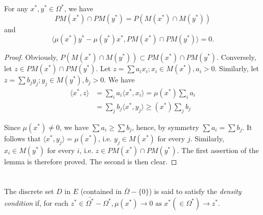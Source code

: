 \begin{lem}\label{chap6:lem4} %
  For any $x^* , y^* \in \Omega^* $, we have 
  $$
  PM(x^*)\cap PM (y^*) = P(M(x^*)\cap M (y^*)) 
  $$
  and 
  $$
  \langle \mu (x^*) y^* - \mu (y^*) x^*, PM (x^*) \cap PM(y^*)\rangle = 0.
  $$
\end{lem}

\begin{proof}
  Obviously, $P(M(x^*)\cap M(y^*))\subset PM (x^*)\cap PM
  (y^*)$. Conversely, let $z \in PM (x^*)\cap PM (y^*)$. Let $z = \sum
  a_i x_i; x_i \in M(x^*), a_i >0$. Similarly, let\pageoriginale $z = \sum b_j y_j ;
  y_j \in M(y^*), b_j > 0$. We have  
  \begin{align*}
    \langle x^*, z \rangle &= \sum_i a_i \langle x^*, x_i \rangle = \mu
    (x^*) \sum_i a_i\\ 
    &= \sum_j b_j \langle x^*, y_j \rangle \geq (x^*) \sum_j b_j
  \end{align*}

  Since $\mu (x^*)\neq 0$, we have $\sum  a_i \geq \sum  b_j $, hence,
  by symmetry $\sum  a_i = \sum  b_j $. It follows that $\langle x^* ,
  y_j \rangle = \mu(x^*)$, i.e. $y_j \in M(x^*)$ for every
  $j$. Similarly, $x_i \in M(y^*)$ for every $i$, i.e. $z \in PM
  (x^*)\cap PM(y^*)$. The first assertion of the lemma is therefore
  proved. The second is then clear.  
\end{proof}

\section{}%

\begin{defi*}
  The discrete set $D$ in $E$ (contained in $\bar{\Omega} -\{0\}$) is
  said to satisfy the \textit{density condition} if, for each $z^* \in
  \bar{\Omega^*} -{\Omega^*} , \mu (x^*) \to 0 \text{ as } x^* (\in
  \Omega^*) \to z^*$.  
\end{defi*}

